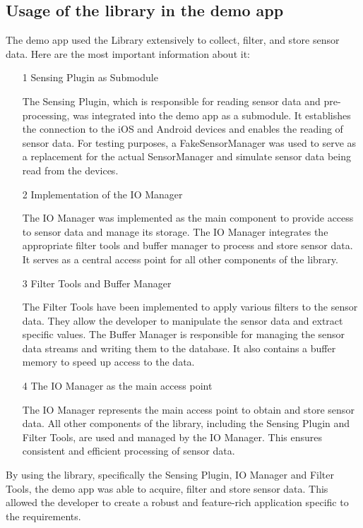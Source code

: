 \documentclass[12pt]{article}
\newcounter{fr}
\begin{document}
\subsection{Usage of the library in the demo app}
    The demo app used the Library extensively to collect, filter, and store sensor data. Here are the most important information about it:
    \begin{itemize}
        \item[1] Sensing Plugin as Submodule
        
        The Sensing Plugin, which is responsible for reading sensor data and pre-processing, was integrated into the demo app as a submodule. It establishes the connection to the iOS and Android devices and enables the reading of sensor data. For testing purposes, a FakeSensorManager was used to serve as a replacement for the actual SensorManager and simulate sensor data being read from the devices.
        \item[2] Implementation of the IO Manager
        
        The IO Manager was implemented as the main component to provide access to sensor data and manage its storage. The IO Manager integrates the appropriate filter tools and buffer manager to process and store sensor data. It serves as a central access point for all other components of the library.
        \item[3] Filter Tools and Buffer Manager

        The Filter Tools have been implemented to apply various filters to the sensor data. They allow the developer to manipulate the sensor data and extract specific values. The Buffer Manager is responsible for managing the sensor data streams and writing them to the database. It also contains a buffer memory to speed up access to the data.
        \item[4] The IO Manager as the main access point

        The IO Manager represents the main access point to obtain and store sensor data. All other components of the library, including the Sensing Plugin and Filter Tools, are used and managed by the IO Manager. This ensures consistent and efficient processing of sensor data.
    \end{itemize}
By using the library, specifically the Sensing Plugin, IO Manager and Filter Tools, the demo app was able to acquire, filter and store sensor data. This allowed the developer to create a robust and feature-rich application specific to the requirements.
\end{document}

